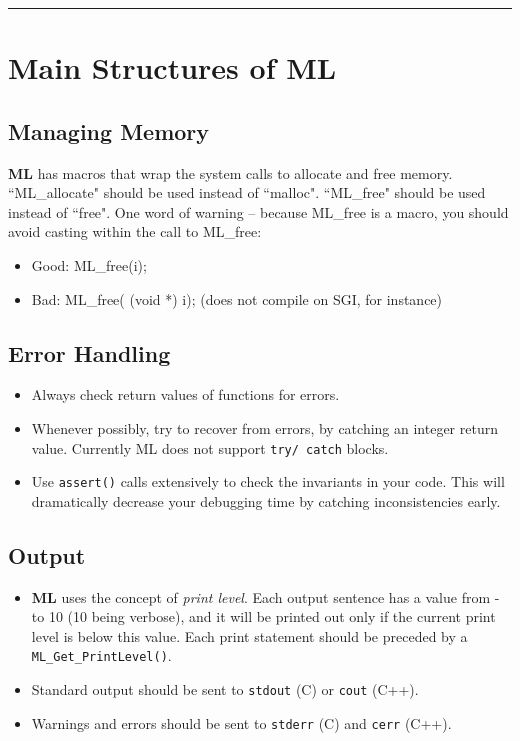 \documentclass[10pt,letter,relax]{SANDreport}
\newcommand{\HRule}{\noindent\rule{\linewidth}{1mm}}
\newcommand{\ML}     {{\bf ML }}
\begin{document}
\HRule
\clearpage
\newpage


\section{Main Structures of ML}
\label{sec:structured}

\subsection{Managing Memory}

\ML has macros that wrap the system calls to allocate and free memory.
``ML\_allocate" should be used instead of ``malloc".
``ML\_free" should be used instead of ``free".
One word of warning -- because ML\_free is a macro, you should avoid casting
within the call to ML\_free:
\begin{itemize}
\item Good: ML\_free(i);
\item Bad: ML\_free( (void *) i); (does not compile on SGI, for instance)
\end{itemize}


\subsection{Error Handling}

\begin{itemize}
\item Always check return values of functions for errors.
\item Whenever possibly, try to recover from errors, by catching an integer
return value. Currently ML does not support \verb!try/ catch! blocks.
\item Use \verb!assert()! calls extensively to check the invariants in your
  code. This will dramatically decrease your debugging time by catching
  inconsistencies early.
\end{itemize}

\subsection{Output}

\begin{itemize}
\item \ML uses the concept of {\sl print level}. Each output sentence has a
  value from - to 10 (10 being verbose), and it will be printed out only if
  the current print level is below this value. Each print statement should be
  preceded by a \verb!ML_Get_PrintLevel()!.
\item Standard output should be sent to \verb!stdout! (C) or \verb!cout! (C++).
\item Warnings and errors should be sent to \verb!stderr! (C) and \verb!cerr!
(C++).
\end{itemize}
\end{document}

